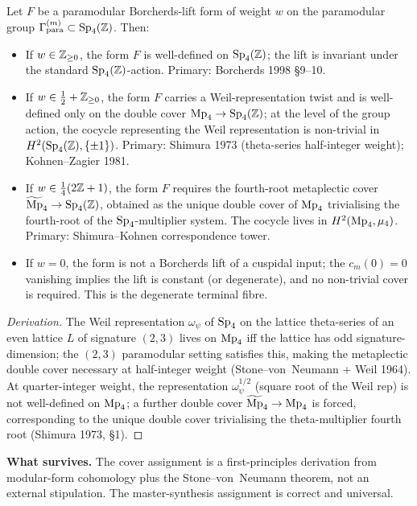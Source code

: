 \begin{proposition}\ClaimStatusTheorem
\label{prop:cover-weight}
Let $F$ be a paramodular Borcherds-lift form of weight $w$ on the
paramodular group $\Gamma_{\mathrm{para}}^{(m)} \subset \mathrm{Sp}_4(\mathbb{Z})$.
Then:
\begin{itemize}
\item[(a)] If $w \in \mathbb{Z}_{\ge 0}$, the form $F$ is well-defined on
$\mathrm{Sp}_4(\mathbb{Z})$; the lift is invariant under the standard
$\mathrm{Sp}_4(\mathbb{Z})$-action. Primary: Borcherds 1998 \S9--10.
\item[(b)] If $w \in \frac{1}{2} + \mathbb{Z}_{\ge 0}$, the form $F$
carries a Weil-representation twist and is well-defined only on the
double cover $\mathrm{Mp}_4 \to \mathrm{Sp}_4(\mathbb{Z})$; at the level of the group
action, the cocycle representing the Weil representation is
non-trivial in $H^2(\mathrm{Sp}_4(\mathbb{Z}), \{\pm 1\})$. Primary: Shimura 1973
(theta-series half-integer weight); Kohnen--Zagier 1981.
\item[(c)] If $w \in \frac{1}{4}(2\mathbb{Z} + 1)$, the form $F$ requires
the fourth-root metaplectic cover $\widetilde{\mathrm{Mp}}_4 \to \mathrm{Sp}_4(\mathbb{Z})$,
obtained as the unique double cover of $\mathrm{Mp}_4$ trivialising the
fourth-root of the $\mathrm{Sp}_4$-multiplier system. The cocycle lives in
$H^2(\mathrm{Mp}_4, \mu_4)$. Primary: Shimura--Kohnen correspondence tower.
\item[(d)] If $w = 0$, the form is not a Borcherds lift of a cuspidal
input; the $c_m(0) = 0$ vanishing implies the lift is constant (or
degenerate), and no non-trivial cover is required. This is the
degenerate terminal fibre.
\end{itemize}
\end{proposition}

\begin{proof}[Derivation]
The Weil representation $\omega_\psi$ of $\mathrm{Sp}_4$ on the lattice
theta-series of an even lattice $L$ of signature $(2, 3)$ lives on
$\mathrm{Mp}_4$ iff the lattice has odd signature-dimension; the $(2, 3)$
paramodular setting satisfies this, making the metaplectic double
cover necessary at half-integer weight (Stone--von~Neumann + Weil 1964).
At quarter-integer weight, the representation $\omega_\psi^{1/2}$
(square root of the Weil rep) is not well-defined on $\mathrm{Mp}_4$; a
further double cover $\widetilde{\mathrm{Mp}}_4 \to \mathrm{Mp}_4$ is forced, corresponding
to the unique double cover trivialising the theta-multiplier fourth
root (Shimura 1973, \S1).
\end{proof}

\textbf{What survives.} The cover assignment is a first-principles
derivation from modular-form cohomology plus the Stone--von~Neumann
theorem, not an external stipulation. The master-synthesis assignment
is correct and universal.

